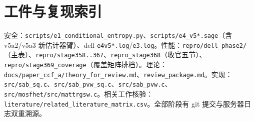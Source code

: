 \documentclass[11pt]{article}
\begin{document}
\section{工件与复现索引}

{\sloppy 安全：\texttt{scripts/e1\_conditional\_entropy.py}、\texttt{scripts/e4\_v5*.sage}（含 v5a2/v5a3 新估计器臂）、dell \texttt{e4v5*.log}/\texttt{e3.log}。性能：\texttt{repro/dell\_phase2/}（主表）、\texttt{repro/stage358..367}、\texttt{repro\_stage368}（收官五节）、\texttt{repro/stage369\_coverage}（覆盖矩阵排档）。理论：\texttt{docs/paper\_ccf\_a/theory\_for\_review.md}、\texttt{review\_package.md}。实现：\texttt{src/sab\_sq.c}、\texttt{src/sab\_pvw\_sq.c}、\texttt{src/sab\_pvw.c}、\texttt{src/mosfhet/src/mattrgsw.c}。相关工作核验：\texttt{literature/related\_literature\_matrix.csv}。全部阶段有 git 提交与服务器日志双重溯源。\par}
\end{document}
